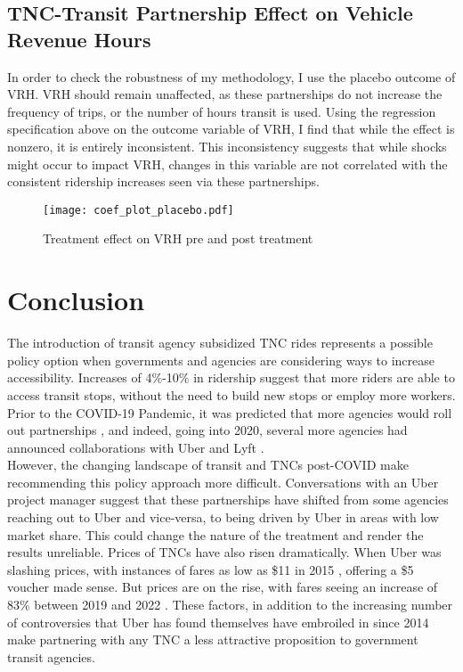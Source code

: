 \documentclass [12pt]{report}
\begin{document}
\subsection*{TNC-Transit Partnership Effect on Vehicle Revenue Hours}
In order to check the robustness of my methodology, I use the placebo outcome of VRH. VRH should remain unaffected, as these partnerships do not increase the frequency of trips, or the number of hours transit is used. Using the regression specification above on the outcome variable of VRH, I find that while the effect is nonzero, it is entirely inconsistent. This inconsistency suggests that while shocks might occur to impact VRH, changes in this variable are not correlated with the consistent ridership increases seen via these partnerships.
\begin{figure}[H]
    \centering
    \texttt{[image: coef\_plot\_placebo.pdf]} %
    \caption{Treatment effect on VRH pre and post treatment}
\end{figure}

\section*{Conclusion}
The introduction of transit agency subsidized TNC rides represents a possible policy option when governments and agencies are considering ways to increase accessibility. Increases of 4\%-10\% in ridership suggest that more riders are able to access transit stops, without the need to build new stops or employ more workers. Prior to the COVID-19 Pandemic, it was predicted that more agencies would roll out partnerships \parencite{depaul}, and indeed, going into 2020, several more agencies had announced collaborations with Uber and Lyft \parencite{atpapartner}. \\
\indent However, the changing landscape of transit and TNCs post-COVID make recommending this policy approach more difficult. Conversations with an Uber project manager suggest that these partnerships have shifted from some agencies reaching out to Uber and vice-versa, to being driven by Uber in areas with low market share. This could change the nature of the treatment and render the results unreliable. Prices of TNCs have also risen dramatically. When Uber was slashing prices, with instances of fares as low as \$11 in 2015 \parencite{vox}, offering a \$5 voucher made sense. But prices are on the rise, with fares seeing an increase of 83\% between 2019 and 2022 \parencite{sherman}. These factors, in addition to the increasing number of controversies that Uber has found themselves have embroiled in since 2014 \parencite{guardian} make partnering with any TNC a less attractive proposition to government transit agencies.
\end{document}
